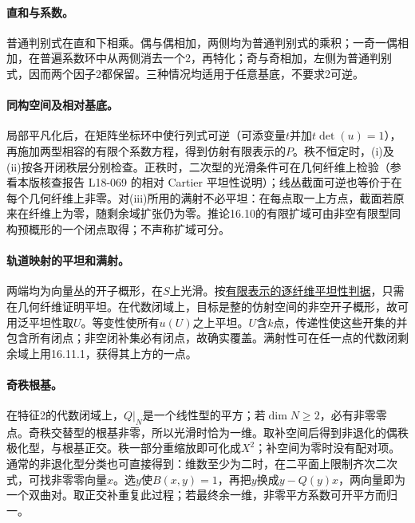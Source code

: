 \paragraph{直和与系数。}
普通判别式在直和下相乘。偶与偶相加，两侧均为普通判别式的乘积；一奇一偶相加，在普遍系数环中从两侧消去一个2，再特化；奇与奇相加，左侧为普通判别式，因而两个因子2都保留。三种情况均适用于任意基底，不要求2可逆。
\par\endgroup

\begingroup
\def\OO{\mathcal O}
\def\Qsp{\mathcal Q}
\def\Sym{\operatorname{Sym}}
\def\Isom{\operatorname{Isom}}
\def\Hom{\operatorname{Hom}}
\hypertarget{audit:L18-071}{}

\paragraph{同构空间及相对基底。}
局部平凡化后，在矩阵坐标环中使行列式可逆（可添变量$t$并加$t\det(u)=1$），再施加两型相容的有限个系数方程，得到仿射有限表示的$P$。秩不恒定时，(i)及(ii)按各开闭秩层分别检查。正秩时，二次型的光滑条件可在几何纤维上检验（参看本版核查报告 L18-069 的相对 Cartier 平坦性说明）；线丛截面可逆也等价于在每个几何纤维上非零。对(iii)所用的满射不必平坦：在每点取一上方点，截面若原来在纤维上为零，随剩余域扩张仍为零。推论16.10的有限扩域可由非空有限型同构预概形的一个闭点取得；不声称扩域可分。

\paragraph{轨道映射的平坦和满射。}
两端均为向量丛的开子概形，在$S$上光滑。按\href{https://stacks.math.columbia.edu/tag/039C}{有限表示的逐纤维平坦性判据}，只需在几何纤维证明平坦。在代数闭域上，目标是整的仿射空间的非空开子概形，故可用泛平坦性取$U$。等变性使所有$u(U)$之上平坦。$U$含$k$点，传递性使这些开集的并包含所有闭点；非空闭补集必有闭点，故确实覆盖。满射性可在任一点的代数闭剩余域上用16.11.1，获得其上方的一点。

\paragraph{奇秩根基。}
在特征2的代数闭域上，$Q|_N$是一个线性型的平方；若$\dim N\ge2$，必有非零零点。奇秩交替型的根基非零，所以光滑时恰为一维。取补空间后得到非退化的偶秩极化型，与根基正交。秩一部分重缩放即可化成$X^2$；补空间为零时没有配对项。通常的非退化型分类也可直接得到：维数至少为二时，在二平面上限制齐次二次式，可找非零零向量$x$。选$y$使$B(x,y)=1$，再把$y$换成$y-Q(y)x$，两向量即为一个双曲对。取正交补重复此过程；若最终余一维，非零平方系数可开平方而归一。

